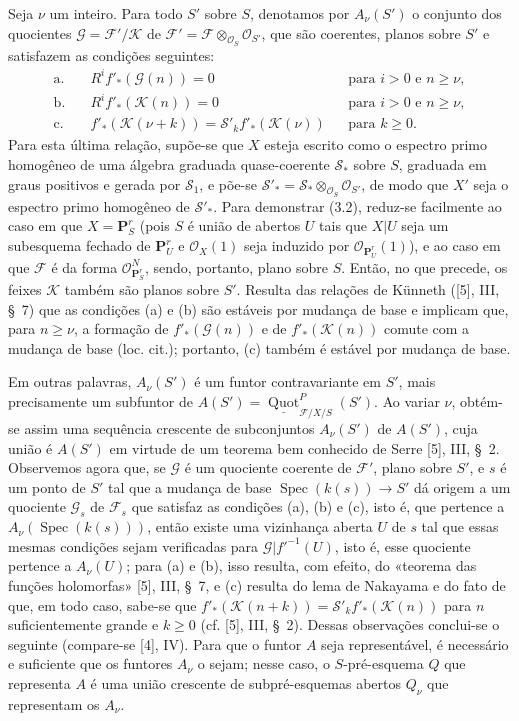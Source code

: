 Seja $\nu$ um inteiro. Para todo $S'$ sobre $S$, denotamos por $A_\nu(S')$ o
conjunto dos quocientes $\mathcal G=\mathcal F'/\mathcal K$ de
$\mathcal F'=\mathcal F\otimes_{\mathcal O_S}\mathcal O_{S'}$, que são
coerentes, planos sobre $S'$ e satisfazem as condições seguintes:
\begin{align*}
\text{a.}\quad &R^if'_*(\mathcal G(n))=0 &&\text{para $i>0$ e $n\geq\nu$},\\
\text{b.}\quad &R^if'_*(\mathcal K(n))=0 &&\text{para $i>0$ e $n\geq\nu$},\\
\text{c.}\quad &f'_*(\mathcal K(\nu+k))
=\mathcal S'_k f'_*(\mathcal K(\nu)) &&\text{para $k\geq0$}.
\end{align*}
Para esta última relação, supõe-se que $X$ esteja escrito como o espectro primo
homogêneo de uma álgebra graduada quase-coerente $\mathcal S_*$ sobre $S$,
graduada em graus positivos e gerada por $\mathcal S_1$, e põe-se
$\mathcal S'_* =\mathcal S_*\otimes_{\mathcal O_S}\mathcal O_{S'}$, de modo
que $X'$ seja o espectro primo homogêneo de $\mathcal S'_*$. Para demonstrar
(3.2), reduz-se facilmente ao caso em que $X=\mathbf P^r_S$ (pois $S$ é união
de abertos $U$ tais que $X|U$ seja um subesquema fechado de $\mathbf P^r_U$ e
$\mathcal O_X(1)$ seja induzido por $\mathcal O_{\mathbf P^r_U}(1)$), e ao
caso em que $\mathcal F$ é da forma
$\mathcal O_{\mathbf P^r_S}^{N}$, sendo, portanto, plano sobre $S$. Então, no
que precede, os feixes $\mathcal K$ também são planos sobre $S'$. Resulta das
relações de Künneth ([5], III, \S~7) que as condições (a) e (b) são estáveis
por mudança de base e implicam que, para $n\geq\nu$, a formação de
$f'_*(\mathcal G(n))$ e de $f'_*(\mathcal K(n))$ comute com a mudança de base
(loc. cit.); portanto, (c) também é estável por mudança de base.

Em outras palavras, $A_\nu(S')$ é um funtor contravariante em $S'$, mais
precisamente um subfuntor de
$A(S')=\underline{\operatorname{Quot}}^P_{\mathcal F/X/S}(S')$. Ao variar
$\nu$, obtém-se assim uma sequência crescente de subconjuntos $A_\nu(S')$ de
$A(S')$, cuja união é $A(S')$ em virtude de um teorema bem conhecido de
Serre [5], III, \S~2. Observemos agora que, se $\mathcal G$ é um quociente
coerente de $\mathcal F'$, plano sobre $S'$, e $s$ é um ponto de $S'$ tal que
a mudança de base $\operatorname{Spec}(k(s))\longrightarrow S'$ dá origem a
um quociente $\mathcal G_s$ de $\mathcal F_s$ que satisfaz as condições (a),
(b) e (c), isto é, que pertence a $A_\nu(\operatorname{Spec}(k(s)))$, então
existe uma vizinhança aberta $U$ de $s$ tal que essas mesmas condições sejam
verificadas para $\mathcal G|f'^{-1}(U)$, isto é, esse quociente pertence a
$A_\nu(U)$; para (a) e (b), isso resulta, com efeito, do «teorema das funções
holomorfas» [5], III, \S~7, e (c) resulta do lema de Nakayama e do fato de que,
em todo caso, sabe-se que
$f'_*(\mathcal K(n+k))=\mathcal S'_k f'_*(\mathcal K(n))$
para $n$ suficientemente grande e $k\geq0$ (cf. [5], III, \S~2). Dessas
observações conclui-se o seguinte (compare-se [4], IV). Para que o funtor $A$
seja representável, é necessário e suficiente que os funtores $A_\nu$ o sejam;
nesse caso, o $S$-pré-esquema $Q$ que representa $A$ é uma união crescente de
subpré-esquemas abertos $Q_\nu$ que representam os $A_\nu$.

